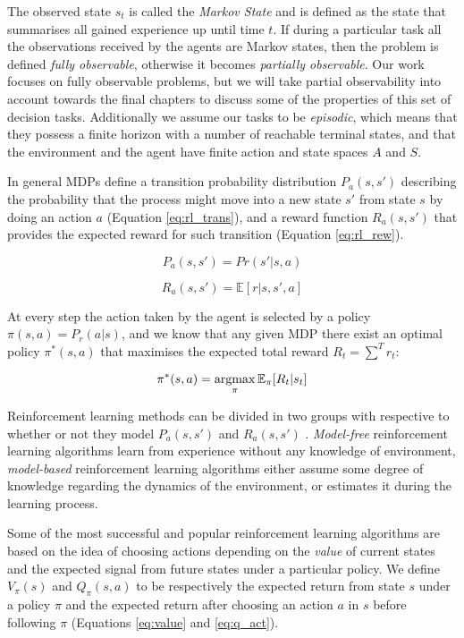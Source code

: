 The observed state $s_t$ is called the \emph{Markov State} and is defined as the
state that summarises all gained experience up until time $t$. If during a
particular task all the observations received by the agents are Markov states,
then the problem is defined \emph{fully observable}, otherwise it becomes
\emph{partially observable}. Our work focuses on fully observable problems, but
we will take partial observability into account towards the final chapters to
discuss some of the properties of this set of decision tasks. Additionally we
assume our tasks to be \emph{episodic}, which means that they possess a finite
horizon with a number of reachable terminal states, and that the environment and
the agent have finite action and state spaces $A$ and $S$.

In general MDPs define a transition probability distribution $P_a(s, s')$
describing the probability that the process might move into a new state $s'$
from state $s$ by doing an action $a$ (Equation \ref{eq:rl_trans}), and a reward
function $R_a(s, s')$ that provides the expected reward for such transition
(Equation \ref{eq:rl_rew}).

\begin{equation}
P_a(s, s') = Pr(s' | s, a)
\label{eq:rl_trans}
\end{equation}

\begin{equation}
R_a(s, s') = \mathbb{E}[r|s, s', a]
\label{eq:rl_rew}
\end{equation}

At every step the action taken by the agent is selected by a policy $\pi(s, a) =
P_r(a | s)$, and we know that any given MDP there exist an optimal policy
$\pi^*(s, a)$ that maximises the expected total reward $R_t = \sum^T{r_t}$:

\begin{equation}
  \pi^*(s, a) = \operatornamewithlimits{argmax}_{\pi} \mathbb{E}_{\pi}[R_t | s_t]
\end{equation}

Reinforcement learning methods can be divided in two groups with respective to
whether or not they model $P_a(s, s')$ and $R_a(s, s')$
\citep{atkeson1997comparison}. \emph{Model-free} reinforcement learning
algorithms learn from experience without any knowledge of environment,
\emph{model-based} reinforcement learning algorithms either assume some degree
of knowledge regarding the dynamics of the environment, or estimates it during
the learning process.

Some of the most successful and popular reinforcement learning algorithms are
based on the idea of choosing actions depending on the \emph{value} of current
states and the expected signal from future states under a particular policy. We
define $V_{\pi}(s)$ and $Q_{\pi}(s, a)$ to be respectively the expected return
from state $s$ under a policy $\pi$ and the expected return after choosing an
action $a$ in $s$ before following $\pi$ (Equations \ref{eq:value} and
\ref{eq:q_act}).

